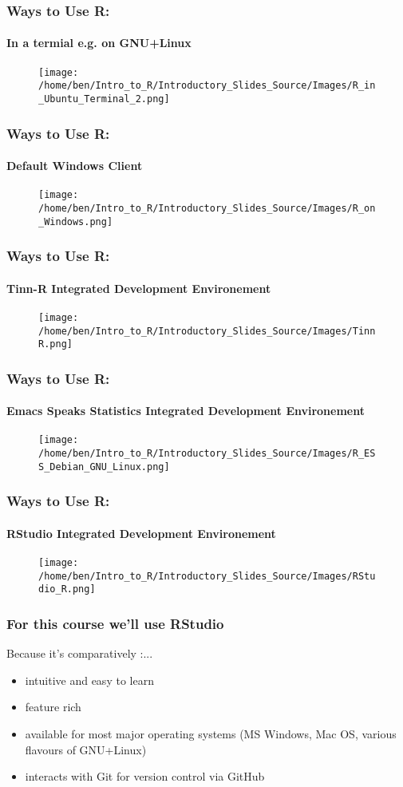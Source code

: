 \documentclass[xcolor=dvipsnames]{beamer}
\begin{document}
\begin{frame}
\frametitle{Ways to Use R:}
\framesubtitle{In a termial e.g. on GNU+Linux}
\begin{figure}
\texttt{[image: /home/ben/Intro\_to\_R/Introductory\_Slides\_Source/Images/R\_in\_Ubuntu\_Terminal\_2.png]}
\end{figure}
\end{frame}

\begin{frame}
\frametitle{Ways to Use R:}
\framesubtitle{Default Windows Client}
\begin{figure}
\texttt{[image: /home/ben/Intro\_to\_R/Introductory\_Slides\_Source/Images/R\_on\_Windows.png]}
\end{figure}
\end{frame}

\begin{frame}
\frametitle{Ways to Use R:}
\framesubtitle{Tinn-R Integrated Development Environement}
\begin{figure}
\texttt{[image: /home/ben/Intro\_to\_R/Introductory\_Slides\_Source/Images/TinnR.png]}
\end{figure}
\end{frame}

\begin{frame}
\frametitle{Ways to Use R:}
\framesubtitle{Emacs Speaks Statistics Integrated Development Environement}
\begin{figure}
\texttt{[image: /home/ben/Intro\_to\_R/Introductory\_Slides\_Source/Images/R\_ESS\_Debian\_GNU\_Linux.png]}
\end{figure}
\end{frame}

\begin{frame}
\frametitle{Ways to Use R:}
\framesubtitle{RStudio Integrated Development Environement}
\begin{figure}
\texttt{[image: /home/ben/Intro\_to\_R/Introductory\_Slides\_Source/Images/RStudio\_R.png]}
\end{figure}
\end{frame}

\begin{frame}
\frametitle{For this course we'll use RStudio}
Because it's comparatively :...
\begin{itemize}
\item intuitive and easy to learn
\item feature rich
\item available for most major operating systems (MS Windows, Mac OS, various flavours of GNU+Linux)
\item interacts with Git for version control via GitHub
\end{itemize}

\end{frame}
\end{document}

